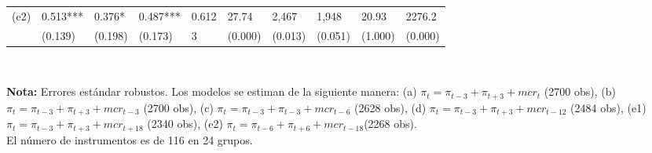 \begin{table}[H]
{\begin{tabular}{ p{1.2cm} p{1.2cm} p{1.2cm} p{1.5cm} p{1.2cm} p{1.2cm} p{1.2cm} p{1.2cm} p{1.2cm} p{1.2cm}}
   (e2) & 0.513*** & 0.376* & 0.487*** &  0.612  &   27.74  &  2,467  &  1,948  & 20.93 &  2276.2   \\
  & \scriptsize{(0.139)} & \scriptsize{(0.198)} & \scriptsize{(0.173)} &  \scriptsize{3}    & \scriptsize{(0.000)} & \scriptsize{(0.013)} & \scriptsize{(0.051)} & \scriptsize{(1.000)} & \scriptsize{(0.000)} \\
   \hline
  \end{tabular}%
}
\label{tab:addlabel}\\
\raggedright  \scriptsize \textbf{Nota:} Errores estándar robustos. Los modelos se estiman de la siguiente manera: (a) $\pi_{t}=\pi_{t-3}+\pi_{t+3}+mcr_{t}$ (2700 obs), (b) $\pi_{t}=\pi_{t-3}+\pi_{t+3}+mcr_{t-3}$ (2700 obs), (c) $\pi_{t}=\pi_{t-3}+\pi_{t-3}+mcr_{t-6}$ (2628 obs), (d) $\pi_{t}=\pi_{t-3}+\pi_{t+3}+mcr_{t-12}$ (2484 obs), (e1) $\pi_{t}=\pi_{t-3}+\pi_{t+3}+mcr_{t+18}$ (2340 obs), (e2) $\pi_{t}=\pi_{t-6}+\pi_{t+6}+mcr_{t-18}$(2268 obs).\\
El número de instrumentos es de 116 en 24 grupos.
\end{table}%


